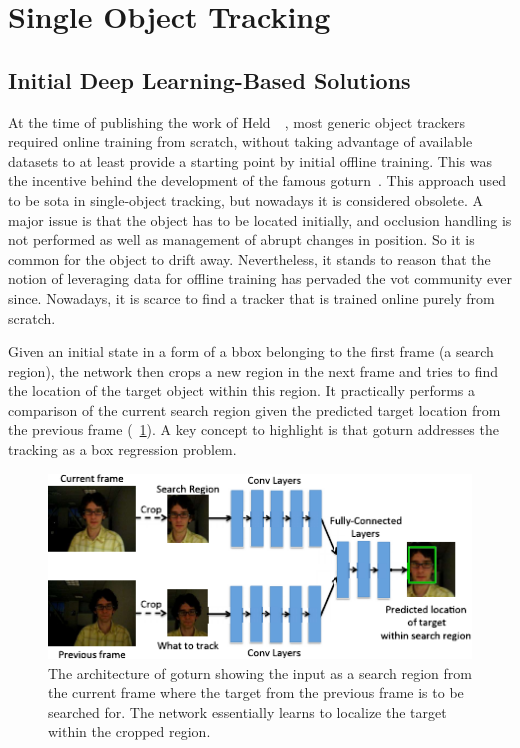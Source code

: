 \section{Single Object Tracking}
\label{sec:SingleObjectTracking}

\subsection{Initial Deep Learning-Based Solutions}
\label{ssec:InitialDeepLearningBasedSolutions}

At the time of publishing the work of Held~\etal{}~\cite{held2016goturn}, most generic object trackers required online training from scratch, without taking advantage of available datasets to at least provide a starting point by initial offline training. This was the incentive behind the development of the famous \gls{goturn}~\cite{held2016goturn}. This approach used to be \gls{sota} in single-object tracking, but nowadays it is considered obsolete. A major issue is that the object has to be located initially, and occlusion handling is not performed as well as management of abrupt changes in position. So it is common for the object to drift away. Nevertheless, it stands to reason that the notion of leveraging data for offline training has pervaded the \gls{vot} community ever since. Nowadays, it is scarce to find a tracker that is trained online purely from scratch.

Given an initial state in a form of a \gls{bbox} belonging to the first frame (a search region), the network then crops a new region in the next frame and tries to find the location of the target object within this region. It practically performs a comparison of the current search region given the predicted target location from the previous frame (\figtext{}~\ref{fig:GOTURNFramework}). A key concept to highlight is that \gls{goturn} addresses the tracking as a box regression problem.

\begin{figure}[t]
    \centerline{\includegraphics[width=0.7\linewidth]{figures/theoretical_foundations/goturn_framework.pdf}}
    \caption[\Gls{goturn} architecture]{The architecture of \gls{goturn} showing the input as a search region from the current frame where the target from the previous frame is to be searched for. The network essentially learns to localize the target within the cropped region. }
    \label{fig:GOTURNFramework}
\end{figure}


